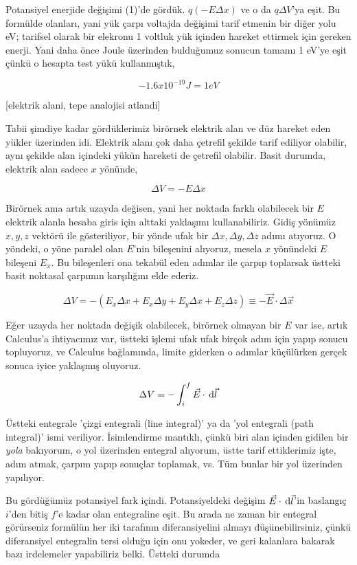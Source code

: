 \documentclass[12pt,fleqn]{article}\usepackage{../../common}
\begin{document}
Potansiyel enerjide değişimi (1)'de gördük. $q (-E \Delta x )$ ve o da $q \Delta
V$'ya eşit. Bu formülde olanları, yani yük çarpı voltajda değişimi tarif etmenin
bir diğer yolu eV; tarifsel olarak bir elekronu 1 voltluk yük içinden hareket
ettirmek için gereken enerji. Yani daha önce Joule üzerinden bulduğumuz sonucun
tamamı 1 eV'ye eşit çünkü o hesapta test yükü kullanmıştık,

$$
-1.6 x 10^{-19} J = 1 eV
$$

[elektrik alani, tepe analojisi atlandi]

Tabii şimdiye kadar gördüklerimiz birörnek elektrik alan ve düz hareket eden
yükler üzerinden idi. Elektrik alanı çok daha çetrefil şekilde tarif ediliyor
olabilir, aynı şekilde alan içindeki yükün hareketi de çetrefil olabilir. Basit
durumda, elektrik alan sadece $x$ yönünde,

$$
\Delta V = -E \Delta x
$$

Birörnek ama artık uzayda değisen, yani her noktada farklı olabilecek bir $E$
elektrik alanla hesaba giris için alttaki yaklaşımı kullanabiliriz. Gidiş
yönümüz $x,y,z$ vektörü ile gösteriliyor, bir yönde ufak bir $\Delta x, \Delta
y, \Delta z$ adımı atıyoruz. O yöndeki, o yöne paralel olan $E$'nin bileşenini
alıyoruz, mesela $x$ yönündeki $E$ bileşeni $E_x$. Bu bileşenleri ona tekabül
eden adımlar ile çarpıp toplarsak üstteki basit noktasal çarpımın karşılığını
elde ederiz.

$$
\Delta V =
-(E_x \Delta x + E_x \Delta y + E_y \Delta x + E_z \Delta z ) \equiv
-\vec{E} \cdot \Delta \vec{x}
$$

Eğer uzayda her noktada değişik olabilecek, birörnek olmayan bir $E$ var ise,
artık Calculus'a ihtiyacımız var, üstteki işlemi ufak ufak birçok adım için
yapıp sonucu topluyoruz, ve Calculus bağlamında, limite giderken o adımlar
küçülürken gerçek sonuca iyice yaklaşmış oluyoruz.

$$
\Delta V = -\int_{i}^{f} \vec{E} \cdot \,\mathrm{d} \vec{l}
$$

Üstteki entegrale 'çizgi entegrali (line integral)' ya da 'yol entegrali (path
integral)' ismi veriliyor. İsimlendirme mantıklı, çünkü biri alan içinden
gidilen bir {\em yola} bakıyorum, o yol üzerinden entegral alıyorum, üstte tarif
ettiklerimiz işte, adım atmak, çarpım yapıp sonuçlar toplamak, vs. Tüm bunlar
bir yol üzerinden yapılıyor. 

Bu gördüğümüz potansiyel fark içindi. Potansiyeldeki değişim $\vec{E} \cdot
\,\mathrm{d}\vec{l}$'in baslangıç $i$'den bitiş $f$'e kadar olan entegraline eşit. Bu
arada ne zaman bir entegral görürseniz formülün her iki tarafının
diferansiyelini almayı düşünebilirsiniz, çünkü diferansiyel entegralin tersi
olduğu için onu yokeder, ve geri kalanlara bakarak bazı irdelemeler yapabiliriz
belki. Üstteki durumda
\end{document}
